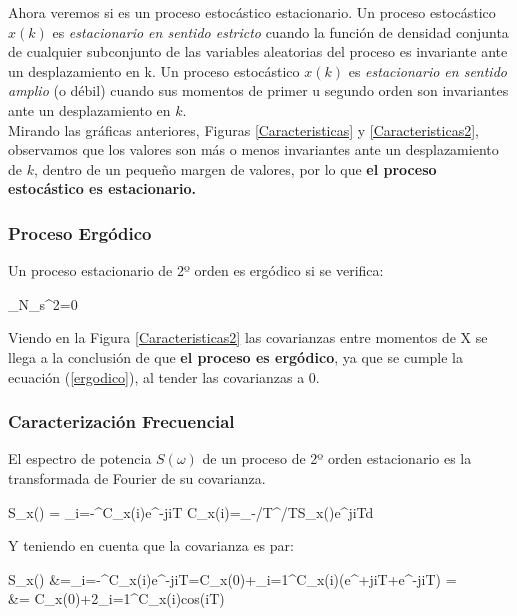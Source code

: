 \documentclass[a4paper, fontsize=11pt]{scrartcl} %
\numberwithin{equation}{section} %
\numberwithin{figure}{section} %
\numberwithin{table}{section} %
\newenvironment{myalign}{\par\nobreak\large\noindent\align}{\endalign} %
\begin{document}
	Ahora veremos si es un proceso estocástico estacionario. Un proceso estocástico $x(k)$ es \textit{estacionario en sentido estricto} cuando la función de densidad conjunta de cualquier subconjunto de las variables aleatorias del proceso es invariante ante un desplazamiento en k. Un proceso estocástico $x(k)$ es \textit{estacionario en sentido amplio} (o débil) cuando sus momentos de primer u segundo orden son invariantes ante un desplazamiento en $k$.\\
	
	Mirando las gráficas anteriores, Figuras \ref{Caracteristicas} y \ref{Caracteristicas2}, observamos que los valores son más o menos invariantes ante un desplazamiento de $k$, dentro de un pequeño margen de valores, por lo que \textbf{el proceso estocástico es estacionario.}
	
	\subsubsection{Proceso Ergódico}
	
	Un proceso estacionario de 2º orden es ergódico si  se verifica:
	
	\begin{myalign}
		\lim\limits_{N\rightarrow\infty}\sigma_s^2=0
		\label{ergodico}
	\end{myalign}
	
	Viendo en la Figura \ref{Caracteristicas2} las covarianzas entre momentos de X se llega a la conclusión de que \textbf{el proceso es ergódico}, ya que se cumple la ecuación (\ref{ergodico}), al tender las covarianzas a 0.
	
	\subsubsection{Caracterización Frecuencial}
	
	El espectro de potencia $S(\omega)$ de un proceso de 2º orden estacionario es la transformada de Fourier de su covarianza.
	
	\begin{myalign}
		S_x(\omega) = \sum_{i=-\infty}^{\infty}C_x(i)e^{-ji\omega T} \Leftrightarrow C_x(i)=\int_{-\pi/T}^{\pi/T}S_x(\omega)e^{ji\omega T}d\omega
	\end{myalign}
	
	Y teniendo en cuenta que la covarianza es par:
	
	\begin{myalign}
		\begin{split}
		S_x(\omega)	&=\sum_{i=-\infty}^{\infty}C_x(i)e^{-ji\omega T}=C_x(0)+\sum_{i=1}^{\infty}C_x(i)\left(e^{+ji\omega T}+e^{-ji\omega T}\right) =\\
					&= C_x(0)+2\sum_{i=1}^{\infty}C_x(i)cos(i\omega T)
		\end{split}
	\end{myalign}
	
\end{document}
